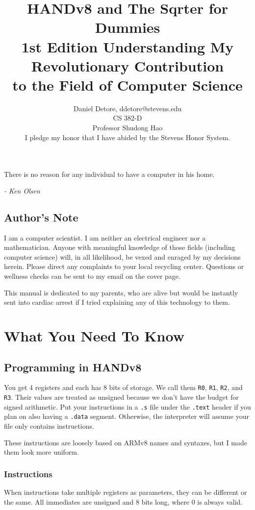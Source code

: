 \documentclass[12pt, oneside]{memoir}
\title{
    {\HUGE\bfseries HANDv8 and The Sqrter for Dummies}\\
    {\large\bfseries 1st Edition}\linebreak\linebreak
    {\Large Understanding My Revolutionary Contribution\\to the Field of Computer Science}\linebreak\linebreak\linebreak\linebreak\linebreak\linebreak\linebreak\linebreak\linebreak\linebreak\linebreak\linebreak\linebreak\linebreak
}
\author{
    {\Large Daniel Detore}, ddetore@stevens.edu\\
    CS 382-D\\
    Professor Shudong Hao\\
    {I pledge my honor that I have abided by the Stevens Honor System.}
}
\newcommand{\R}[1]{{\color{register}\texttt{R#1}}}
\newcommand{\header}[1]{{\color{header}\texttt{#1}}}
\begin{document}
\frontmatter


\maketitle
\thispagestyle{empty}
\newpage

\raggedright

\epigraph{There is no reason for any individual to have a computer in his home.}{\textit{- Ken Olsen}}
\tableofcontents*
\newpage

\setlength{\parindent}{1.5em}
\setlength{\parskip}{1em}

\chapter{Author's Note}
I am a computer scientist. I am neither an electrical engineer nor a mathematician. Anyone with meaningful knowledge of those fields (including computer science) will, in all likelihood, be vexed and enraged by my decisions herein. Please direct any complaints to your local recycling center. Questions or wellness checks can be sent to my email on the cover page.

This manual is dedicated to my parents, who are alive but would be instantly sent into cardiac arrest if I tried explaining any of this technology to them.

\mainmatter
\part{What You Need To Know}

\chapter{Programming in HANDv8}
You get 4 registers and each has 8 bits of storage. We call them \R{0}, \R{1}, \R{2}, and \R{3}. Their values are treated as unsigned because we don't have the budget for signed arithmetic. Put your instructions in a \texttt{.s} file under the \header{.text} header if you plan on also having a \header{.data} segment. Otherwise, the interpreter will assume your file only contains instructions.

These instructions are loosely based on ARMv8 names and syntaxes, but I made them look more uniform.
\section{Instructions}
When instructions take multiple registers as parameters, they can be different or the same. All immediates are unsigned and 8 bits long, where 0 is always valid.
\end{document}
